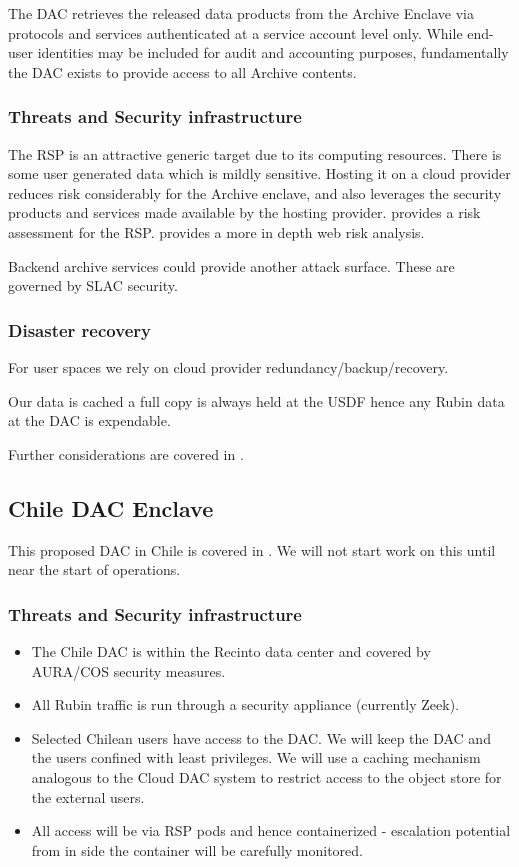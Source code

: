 The DAC retrieves the released data products from the \gls{Archive} Enclave via protocols and services authenticated at a service account level only. While end-user identities may be included for audit and accounting purposes, fundamentally the DAC exists to provide access to all \gls{Archive} contents.

\subsubsection{ Threats and Security infrastructure}
The \gls{RSP} is  an attractive generic target due to its computing resources.
There is some user generated data which is mildly sensitive.
Hosting it on a cloud provider reduces risk considerably for the Archive enclave, and also leverages the security products and services made available by the hosting provider.
 provides a risk assessment for the \gls{RSP}.
 provides a more in depth web risk analysis.

Backend archive services could provide another attack surface.
These are governed by \gls{SLAC} security.

\subsubsection{Disaster recovery}
For user  spaces we rely on cloud provider redundancy/backup/recovery.

Our data is cached a full copy is always held at the \gls{USDF} hence any Rubin data at the DAC is expendable.

Further considerations are covered in .

\subsection{ Chile \gls{DAC} Enclave}
This proposed DAC in Chile is covered in \cite{LDM-572}.
We will not start work on this until near the start of operations.
\subsubsection{ Threats and Security infrastructure}

\begin{itemize}
\item The Chile DAC is within the Recinto data center and covered by AURA/COS security measures.\item All Rubin traffic is run through a security appliance (currently Zeek).
\item Selected Chilean users have access to the DAC. We will keep the DAC and the users confined with least privileges. We will use a caching mechanism analogous to the Cloud DAC system to restrict access to the object store for the external users.
\item All access will be via \gls{RSP} pods and hence containerized - escalation potential from in side the container will be carefully monitored.
\end{itemize}
